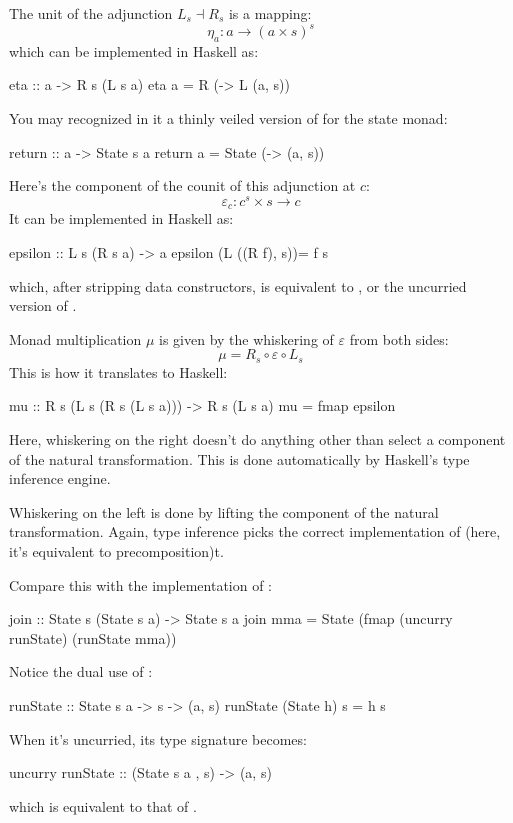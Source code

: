 \documentclass[DaoFP]{subfiles}
\begin{document}
The unit of the adjunction $L_s \dashv R_s$ is a mapping:
\[ \eta_a \colon a \to (a \times s)^s \]
which can be implemented in Haskell as:
\begin{haskell}
eta :: a -> R s (L s a)
eta a = R (\s -> L (a, s))
\end{haskell}
You may recognized in it a thinly veiled version of  for the state monad:
\begin{haskell}
return :: a -> State s a
return a = State (\s -> (a, s))
\end{haskell}

Here's the component of the counit of this adjunction at $c$:
\[ \varepsilon_c \colon c^s \times s \to c \]
It can be implemented in Haskell as:
\begin{haskell}
epsilon :: L s (R s a) -> a
epsilon (L ((R f), s))= f s
\end{haskell}
which, after stripping data constructors, is equivalent to , or the uncurried version of .

Monad multiplication $\mu$ is given by the whiskering of $\varepsilon$ from both sides:
\[ \mu = R_s \circ \varepsilon \circ L_s \]
This is how it translates to Haskell:
\begin{haskell}
mu :: R s (L s (R s (L s a))) -> R s (L s a)
mu = fmap epsilon
\end{haskell}
Here, whiskering on the right doesn't do anything other than select a component of the natural transformation. This is done automatically by Haskell's type inference engine. 

Whiskering on the left is done by lifting the component of the natural transformation. Again, type inference picks the correct implementation of  (here, it's equivalent to precomposition)t.

Compare this with the implementation of :
\begin{haskell}
join :: State s (State s a) -> State s a
join mma = State (fmap (uncurry runState) (runState mma))
\end{haskell}
Notice the dual use of : 
\begin{haskell}
runState :: State s a -> s -> (a, s)
runState (State h) s = h s
\end{haskell}
When it's uncurried, its type signature becomes:
\begin{haskell}
uncurry runState :: (State s a , s) -> (a, s)
\end{haskell}
which is equivalent to that of . 
\end{document}
